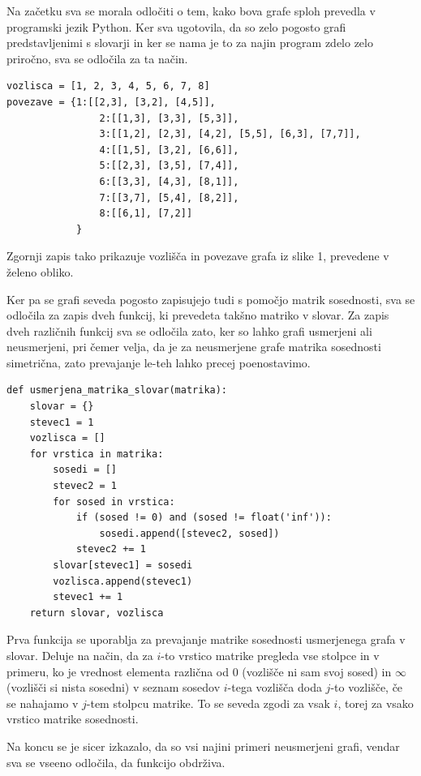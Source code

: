 \documentclass[10pt, a4paper]{article}
\begin{document}
Na začetku sva se morala odločiti o tem, kako bova grafe sploh prevedla v programski jezik Python. Ker sva ugotovila, da so zelo pogosto grafi predstavljenimi s slovarji in ker se nama je to za najin program zdelo zelo priročno, sva se odločila za ta način.

\begin{verbatim}
vozlisca = [1, 2, 3, 4, 5, 6, 7, 8]
povezave = {1:[[2,3], [3,2], [4,5]],
            	2:[[1,3], [3,3], [5,3]],
            	3:[[1,2], [2,3], [4,2], [5,5], [6,3], [7,7]],
            	4:[[1,5], [3,2], [6,6]],
            	5:[[2,3], [3,5], [7,4]],
            	6:[[3,3], [4,3], [8,1]],
            	7:[[3,7], [5,4], [8,2]],
            	8:[[6,1], [7,2]]
           	}
\end{verbatim}

Zgornji zapis tako prikazuje vozlišča in povezave grafa iz slike 1, prevedene v želeno obliko.

\bigskip

Ker pa se grafi seveda pogosto zapisujejo tudi s pomočjo matrik sosednosti, sva se odločila za zapis dveh funkcij, ki prevedeta takšno matriko v slovar. Za zapis dveh različnih funkcij sva se odločila zato, ker so lahko grafi usmerjeni ali neusmerjeni, pri čemer velja, da je za neusmerjene grafe matrika sosednosti simetrična, zato prevajanje le-teh lahko precej poenostavimo.

\begin{verbatim}
def usmerjena_matrika_slovar(matrika):
    slovar = {}
    stevec1 = 1
    vozlisca = []
    for vrstica in matrika:
        sosedi = []
        stevec2 = 1
        for sosed in vrstica:
            if (sosed != 0) and (sosed != float('inf')):
                sosedi.append([stevec2, sosed])
            stevec2 += 1
        slovar[stevec1] = sosedi
        vozlisca.append(stevec1)
        stevec1 += 1
    return slovar, vozlisca
\end{verbatim}

Prva funkcija se uporablja za prevajanje matrike sosednosti usmerjenega grafa v slovar. Deluje na način, da za $i$-to vrstico matrike pregleda vse stolpce in v primeru, ko je vrednost elementa različna od 0 (vozlišče ni sam svoj sosed) in $\infty$ (vozlišči si nista sosedni) v seznam sosedov $i$-tega vozlišča doda $j$-to vozlišče, če se nahajamo v $j$-tem stolpcu matrike. To se seveda zgodi za vsak $i$, torej za vsako vrstico matrike sosednosti.

Na koncu se je sicer izkazalo, da so vsi najini primeri neusmerjeni grafi, vendar sva se vseeno odločila, da funkcijo obdrživa.
\end{document}
